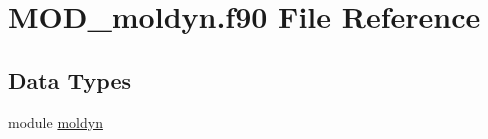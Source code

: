 \hypertarget{MOD__moldyn_8f90}{\section{M\-O\-D\-\_\-moldyn.\-f90 File Reference}
\label{MOD__moldyn_8f90}
}
\subsection*{Data Types}
\begin{DoxyCompactItemize}
\item 
module \hyperlink{classmoldyn}{moldyn}
\end{DoxyCompactItemize}
